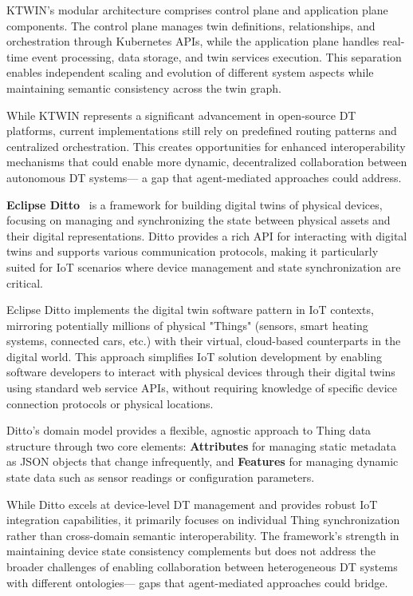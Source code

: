 KTWIN's modular architecture comprises control plane and application plane components.
The control plane manages twin definitions, relationships, and orchestration through Kubernetes APIs,
    while the application plane handles real-time event processing, data storage, and twin services execution.
This separation enables independent scaling and evolution of different system aspects while 
    maintaining semantic consistency across the twin graph.

While KTWIN represents a significant advancement in open-source DT platforms,
    current implementations still rely on predefined routing patterns and centralized orchestration.
This creates opportunities for enhanced interoperability mechanisms that could enable
    more dynamic, decentralized collaboration between autonomous DT systems—
    a gap that agent-mediated approaches could address.

\textbf{Eclipse Ditto}~\cite{eclipseEclipseDittoOpen2025}
    is a framework for building digital twins of physical devices,
    focusing on managing and synchronizing the state between physical assets and their digital representations.
Ditto provides a rich API for interacting with digital twins and supports various communication protocols,
    making it particularly suited for IoT scenarios where device management and state synchronization are critical.

Eclipse Ditto implements the digital twin software pattern in IoT contexts,
    mirroring potentially millions of physical "Things" (sensors, smart heating systems, connected cars, etc.)
    with their virtual, cloud-based counterparts in the digital world.
This approach simplifies IoT solution development by enabling software developers to interact with
    physical devices through their digital twins using standard web service APIs,
    without requiring knowledge of specific device connection protocols or physical locations.

Ditto's domain model provides a flexible, agnostic approach to Thing data structure through two core elements:
    \textbf{Attributes} for managing static metadata as JSON objects that change infrequently, and
    \textbf{Features} for managing dynamic state data such as sensor readings or configuration parameters.

While Ditto excels at device-level DT management and provides robust IoT integration capabilities,
    it primarily focuses on individual Thing synchronization rather than cross-domain semantic interoperability.
The framework's strength in maintaining device state consistency complements but does not address
    the broader challenges of enabling collaboration between heterogeneous DT systems with different ontologies—
    gaps that agent-mediated approaches could bridge.

